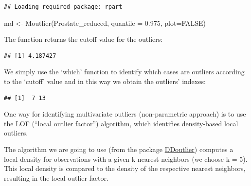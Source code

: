 \documentclass[
]{article}
\newenvironment{Shaded}{\begin{snugshade}}{\end{snugshade}}
\newcommand{\AttributeTok}[1]{\textcolor[rgb]{0.77,0.63,0.00}{#1}}
\newcommand{\CommentTok}[1]{\textcolor[rgb]{0.56,0.35,0.01}{\textit{#1}}}
\newcommand{\ConstantTok}[1]{\textcolor[rgb]{0.00,0.00,0.00}{#1}}
\newcommand{\DecValTok}[1]{\textcolor[rgb]{0.00,0.00,0.81}{#1}}
\newcommand{\FloatTok}[1]{\textcolor[rgb]{0.00,0.00,0.81}{#1}}
\newcommand{\FunctionTok}[1]{\textcolor[rgb]{0.00,0.00,0.00}{#1}}
\newcommand{\NormalTok}[1]{#1}
\newcommand{\OtherTok}[1]{\textcolor[rgb]{0.56,0.35,0.01}{#1}}
\newcommand{\SpecialCharTok}[1]{\textcolor[rgb]{0.00,0.00,0.00}{#1}}
\begin{document}
\begin{verbatim}
## Loading required package: rpart
\end{verbatim}

\begin{Shaded}
\begin{Highlighting}[]
\NormalTok{md }\OtherTok{\textless{}{-}} \FunctionTok{Moutlier}\NormalTok{(Prostate\_reduced, }\AttributeTok{quantile =} \FloatTok{0.975}\NormalTok{, }\AttributeTok{plot=}\ConstantTok{FALSE}\NormalTok{)}
\end{Highlighting}
\end{Shaded}

The function returns the cutoff value for the outliers:

\begin{Shaded}
\end{Shaded}

\begin{verbatim}
## [1] 4.187427
\end{verbatim}

We simply use the `which' function to identify which cases are outliers
according to the `cutoff' value and in this way we obtain the outliers'
indexes:

\begin{Shaded}
\end{Shaded}

\begin{verbatim}
## [1]  7 13
\end{verbatim}

One way for identifying multivariate outliers (non-parametric approach)
is to use the LOF (``local outlier factor'') algorithm, which identifies
density-based local outliers.

The algorithm we are going to use (from the package
\href{https://rdrr.io/cran/DDoutlier/man/LOF.html}{DDoutlier}) computes
a local density for observations with a given k-nearest neighbors (we
choose k = 5). This local density is compared to the density of the
respective nearest neighbors, resulting in the local outlier factor.
\end{document}
